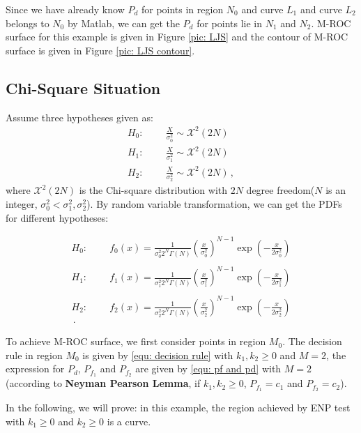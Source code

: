\documentclass[12pt,journal,a4paper,twoside,onecolumn,draft]{IEEEtran}
\begin{document}
\begin{spacing}{2.5}
Since we have already know $P_d$ for points in region $N_0$ and curve $L_1$ and curve $L_2$ belongs to $N_0$ by Matlab, we can get the $P_d$ for points lie in $N_1$ and $N_2$. M-ROC surface for this example is given in Figure  \ref{pic: LJS} and the contour of M-ROC surface is given in Figure \ref{pic: LJS contour}.

\subsection{Chi-Square Situation}
Assume three hypotheses  given as:
\begin{equation}
  \label{equ: Chisquare Hypothesis}
  \begin{split}
    H_0:\;\;\;\;\;\;\;\;\frac{X}{\sigma_0^2} \sim \mathcal{X}^2(2N)\\
    H_1:\;\;\;\;\;\;\;\;\frac{X}{\sigma_1^2} \sim \mathcal{X}^2(2N)\\
    H_2:\;\;\;\;\;\;\;\;\frac{X}{\sigma_2^2} \sim \mathcal{X}^2(2N)\,,
  \end{split}
\end{equation}
where $\mathcal{X}^2(2N)$ is the Chi-square distribution with  $2N$ degree freedom($N$ is an integer, $\sigma_0^2 < \sigma_1^2, \sigma_2^2$). By random variable transformation\cite{mark2011probability}, we can get the PDFs for different hypotheses:

\def \CHISQU[#1]{\frac{1}{#1 2^N\Gamma(N)}\left(\frac{x}{#1}\right)^{N-1}\exp\left(-\frac{x}{2#1}\right)\\}
\begin{equation}
  \label{equ: Chisquare Distribution}
  \begin{split}
    H_0:\;\;\;\;\;\;\;\;f_0(x) = \CHISQU[\sigma_0^2]\\
    H_1:\;\;\;\;\;\;\;\;f_1(x) = \CHISQU[\sigma_1^2]\\
    H_2:\;\;\;\;\;\;\;\;f_2(x) = \CHISQU[\sigma_2^2]\,.
  \end{split}
\end{equation}

To achieve M-ROC surface, we first consider points in region $M_0$.  The decision rule in region $M_0$ is given by \eqref{equ: decision rule}
with $k_1, k_2 \geq 0$ and $M = 2$, the expression for $P_d$, $P_{f_1}$ and $P_{f_2}$ are given by \eqref{equ: pf and pd} with $M = 2$ (according to \textbf{Neyman Pearson Lemma}, if $k_1, k_2 \geq 0$, $P_{f_1} = c_1$ and $P_{f_2} = c_2$).

In the following, we will prove: in this example, the region achieved by ENP test with $k_1 \geq 0$ and $k_2 \geq 0$ is a curve.


\end{spacing}
\end{document}
